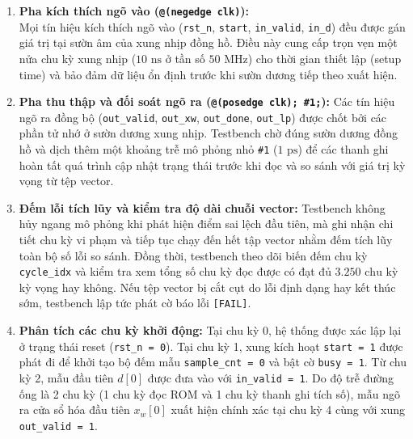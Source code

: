 \begin{enumerate}[leftmargin=1.5em, itemsep=2pt]
    \item \textbf{Pha kích thích ngõ vào (\texttt{@(negedge clk)}):}\\ Mọi tín hiệu kích thích ngõ vào (\texttt{rst\_n}, \texttt{start}, \texttt{in\_valid}, \texttt{in\_d}) đều được gán giá trị tại sườn âm của xung nhịp đồng hồ. Điều này cung cấp trọn vẹn một nửa chu kỳ xung nhịp ($10\text{ ns}$ ở tần số $50\text{ MHz}$) cho thời gian thiết lập (setup time) và bảo đảm dữ liệu ổn định trước khi sườn dương tiếp theo xuất hiện.
    \item \textbf{Pha thu thập và đối soát ngõ ra (\texttt{@(posedge clk); \#1;}):} Các tín hiệu ngõ ra đồng bộ (\texttt{out\_valid}, \texttt{out\_xw}, \texttt{out\_done}, \texttt{out\_lp}) được chốt bởi các phần tử nhớ ở sườn dương xung nhịp. Testbench chờ đúng sườn dương đồng hồ và dịch thêm một khoảng trễ mô phỏng nhỏ \texttt{\#1} ($1\text{ ps}$) để các thanh ghi hoàn tất quá trình cập nhật trạng thái trước khi đọc và so sánh với giá trị kỳ vọng từ tệp vector.
    \item \textbf{Đếm lỗi tích lũy và kiểm tra độ dài chuỗi vector:} Testbench không hủy ngang mô phỏng khi phát hiện điểm sai lệch đầu tiên, mà ghi nhận chi tiết chu kỳ vi phạm và tiếp tục chạy đến hết tập vector nhằm đếm tích lũy toàn bộ số lỗi so sánh. Đồng thời, testbench theo dõi biến đếm chu kỳ \texttt{cycle\_idx} và kiểm tra xem tổng số chu kỳ đọc được có đạt đủ $3.250\text{ chu kỳ}$ kỳ vọng hay không. Nếu tệp vector bị cắt cụt do lỗi định dạng hay kết thúc sớm, testbench lập tức phát cờ báo lỗi \texttt{[FAIL]}.
    \item \textbf{Phân tích các chu kỳ khởi động:} Tại chu kỳ 0, hệ thống được xác lập lại ở trạng thái reset (\texttt{rst\_n = 0}). Tại chu kỳ 1, xung kích hoạt \texttt{start = 1} được phát đi để khởi tạo bộ đếm mẫu \texttt{sample\_cnt = 0} và bật cờ \texttt{busy = 1}. Từ chu kỳ 2, mẫu đầu tiên $d[0]$ được đưa vào với \texttt{in\_valid = 1}. Do độ trễ đường ống là 2 chu kỳ (1 chu kỳ đọc ROM và 1 chu kỳ thanh ghi tích số), mẫu ngõ ra cửa sổ hóa đầu tiên $x_w[0]$ xuất hiện chính xác tại chu kỳ 4 cùng với xung \texttt{out\_valid = 1}.
\end{enumerate}

